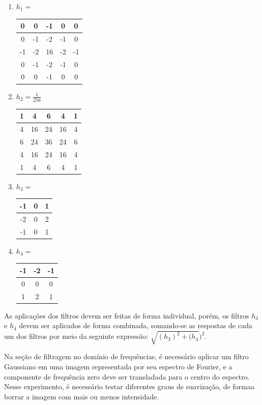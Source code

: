 \documentclass[twoside,twocolumn]{article}
\begin{document}
\begin{enumerate}[label=(\alph*)]
\item $h_{1} = $ \begin{tabular}[H]{|c|c|c|c|c|}
\hline
0  & 0  & -1 & 0  & 0  \\ \hline
0  & -1 & -2 & -1 & 0  \\ \hline
-1 & -2 & 16 & -2 & -1 \\ \hline
0  & -1 & -2 & -1 & 0  \\ \hline
0  & 0  & -1 & 0  & 0  \\ \hline
\end{tabular}

\item $h_{2} = \frac{1}{256}$ \begin{tabular}{|c|c|c|c|c|}
\hline
1 & 4  & 6  & 4  & 1 \\ \hline
4 & 16 & 24 & 16 & 4 \\ \hline
6 & 24 & 36 & 24 & 6 \\ \hline
4 & 16 & 24 & 16 & 4 \\ \hline
1 & 4  & 6  & 4  & 1 \\ \hline
\end{tabular}

\item $h_{3} = $ \begin{tabular}{|c|c|c|}
\hline
-1 & 0 & 1 \\ \hline
-2 & 0 & 2 \\ \hline
-1 & 0 & 1 \\ \hline
\end{tabular}

\item $h_{4} = $ \begin{tabular}{|c|c|c|}
\hline
-1 & -2 & -1 \\ \hline
0  & 0  & 0  \\ \hline
1  & 2  & 1  \\ \hline
\end{tabular}
\end{enumerate}

As aplicações dos filtros devem ser feitas de forma individual, porém, os filtros $h_{3}$ e $h_{4}$ devem ser aplicados de forma combinada, somando-se as respostas de cada um dos filtros por meio da seguinte expressão: $\sqrt{(h_{3})^{2} + (h_{4}})^{2}$.

Na seção de filtragem no domínio de frequências, é necessário aplicar um filtro Gaussiano em uma imagem representada por seu espectro de Fourier, e a componente de frequência zero deve ser transladada para o centro do espectro. Nesse experimento, é necessário testar diferentes graus de suavização, de formaa borrar a imagem com mais ou menos intensidade.
\end{document}

